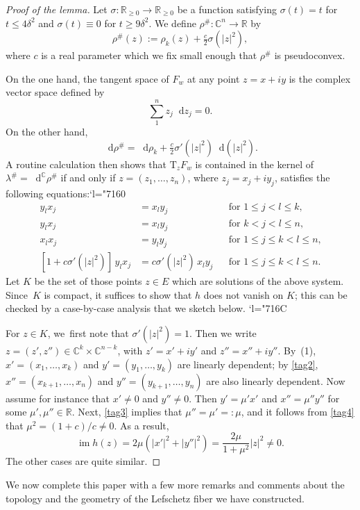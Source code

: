 \documentclass[JEP,XML,SOM,Unicode]{cedram}
\newcommand{\Changel}{\mathcode`l="7160}
\newcommand{\Changelback}{\mathcode`l="716C}
\newcommand{\C}{{\mathbb C}}
\newcommand{\R}{{\mathbb R}}
\newcommand{\im}{\operatorname{im}}
\newcommand{\etc}{,\ldots,}
\newcommand{\rT}{\mathrm{T}}
\renewcommand{\d}{\mathop{}\!\mathrm d}
\newcommand{\dc}{\d^{\scriptscriptstyle{\C}}}
\newcommand{\drho}{\d\rho}
\newcommand{\dz}{\d z}
\newcommand{\de}{\mathrel{:=}}
\let\on\colon
\theoremstyle{plain}
\theoremstyle{definition}
\begin{document}
\begin{proof}[Proof of the lemma]
Let $\sigma \on \R_{\ge0} \to \R_{\ge0}$ be a function satisfying $\sigma(t) =
t$ for $t \le 4\delta^2$ and $\sigma(t) \equiv 0$ for $t \ge 9\delta^2$.
We define $\rho^\# \on \C^n \to \R$ by
\[
\rho^\#(z) \de \rho_k(z) + \tfrac c2 \sigma(|z|^2),
\]
where $c$ is a real parameter which we fix small enough that $\rho^\#$ is
pseudoconvex.

On the one hand, the tangent space of $F_w$ at any point $z = x+iy$ is the
complex vector space defined by
\[
\sum_1^n z_j \dz_j = 0.
\]
On the other hand,
\[
\drho^\# = \drho_k + \tfrac c2 \sigma'(|z|^2) \d(|z|^2).
\]
A routine calculation then shows that $\rT_zF_w$ is contained in the kernel of
$\lambda^\# = \dc\rho^\#$ if and only if $z = (z_1 \etc z_n)$, where $z_j = x_j
+ iy_j$, satisfies the following equations:\Changel
\begin{align*}
 y_lx_j &= x_ly_j && \text{for $1 \le j < l \le k$,} \tag{1}\label{tag1} \\
 y_lx_j &= x_ly_j && \text{for $k < j < l \le n$,} \tag{2}\label{tag2} \\
 x_lx_j &= y_ly_j && \text{for $1 \le j \le k < l \le n$,} \tag{3}\label{tag3} \\
 [1+c\sigma'(|z|^2)]\, y_lx_j &= c \sigma'(|z|^2)\, x_ly_j &&
 \text{for $1 \le j \le k < l \le n$.} \tag{4}\label{tag4}
\end{align*}
Let $K$ be the set of those points $z \in E$ which are solutions of the above
system. Since~$K$ is compact, it suffices to show that $h$ does not vanish on
$K$; this can be checked by a case-by-case analysis that we sketch below.
\Changelback

For $z \in K$, we~first note that $\sigma'(|z|^2) = 1$. Then we write $z = (z',
z'') \in \C^k \times \C^{n-k}$, with $z' = x'+iy'$ and $z'' = x''+iy''$. By~(1),
$x' = (x_1 \etc x_k)$ and $y' = (y_1 \etc y_k)$ are linearly dependent; by \eqref{tag2},
$x'' = (x_{k+1} \etc x_n)$ and $y'' = (y_{k+1} \etc y_n)$ are also linearly
dependent. Now assume for instance that $x' \ne 0$ and $y'' \ne 0$. Then $y' =
\mu' x'$ and $x'' = \mu'' y''$ for some $\mu', \mu'' \in \R$. Next, \eqref{tag3} implies
that $\mu'' = \mu' \mathrel{=:} \mu$, and it follows from \eqref{tag4} that $\mu^2 =
(1+c)/c \ne 0$. As a result,
\[
\im h(z) = 2\mu (|x'|^2 + |y''|^2)
 = \frac{ 2\mu }{ 1+\mu^2 } |z|^2 \ne 0.
\]
The other cases are quite similar.
\end{proof}

We now complete this paper with a few more remarks and comments about the
topology and the geometry of the Lefschetz fiber we have constructed.
\end{document}

